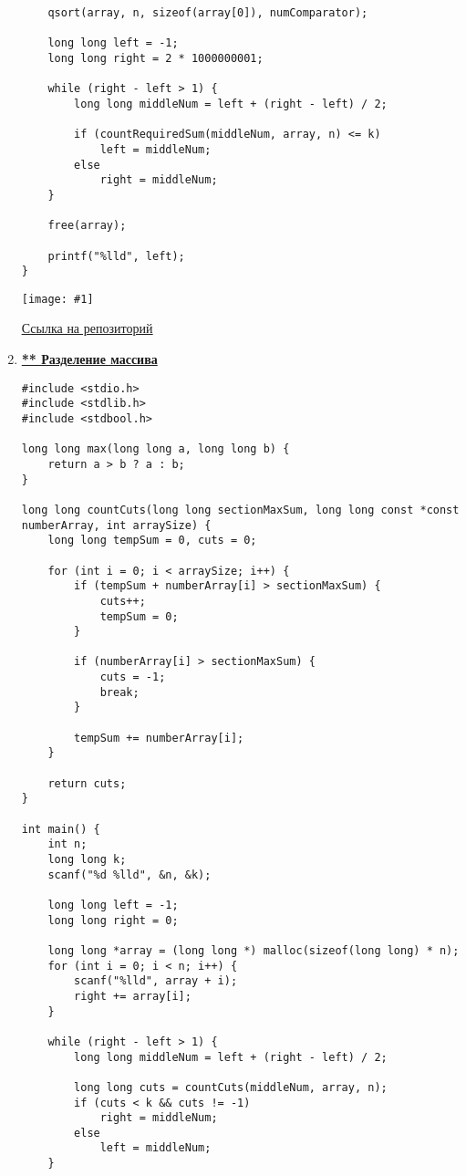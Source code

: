 \documentclass[a4paper,14pt]{extarticle}
\newcommand\codeforcesresult[1]{
    \begin{center}
        \texttt{[image: \#1]}
    \end{center}
}
\begin{document}
\begin{enumerate}
\begin{verbatim}
    qsort(array, n, sizeof(array[0]), numComparator);

    long long left = -1;
    long long right = 2 * 1000000001;

    while (right - left > 1) {
        long long middleNum = left + (right - left) / 2;

        if (countRequiredSum(middleNum, array, n) <= k)
            left = middleNum;
        else
            right = middleNum;
    }

    free(array);

    printf("%lld", left);
}
\end{verbatim}
\codeforcesresult{/codeforceresults/1201С}
\href{https://github.com/IAmProgrammist/programming-and-algorithmization-basics/blob/c/lab10/15.c}{\underline{Ссылка на репозиторий}}

\newpage
\item \href{https://codeforces.com/edu/course/2/lesson/6/3/practice/contest/285083/problem/B}{\textbf{** Разделение массива}}
\begin{verbatim}
#include <stdio.h>
#include <stdlib.h>
#include <stdbool.h>

long long max(long long a, long long b) {
    return a > b ? a : b;
}

long long countCuts(long long sectionMaxSum, long long const *const numberArray, int arraySize) {
    long long tempSum = 0, cuts = 0;

    for (int i = 0; i < arraySize; i++) {
        if (tempSum + numberArray[i] > sectionMaxSum) {
            cuts++;
            tempSum = 0;
        }

        if (numberArray[i] > sectionMaxSum) {
            cuts = -1;
            break;
        }

        tempSum += numberArray[i];
    }

    return cuts;
}

int main() {
    int n;
    long long k;
    scanf("%d %lld", &n, &k);

    long long left = -1;
    long long right = 0;

    long long *array = (long long *) malloc(sizeof(long long) * n);
    for (int i = 0; i < n; i++) {
        scanf("%lld", array + i);
        right += array[i];
    }

    while (right - left > 1) {
        long long middleNum = left + (right - left) / 2;

        long long cuts = countCuts(middleNum, array, n);
        if (cuts < k && cuts != -1)
            right = middleNum;
        else
            left = middleNum;
    }


\end{verbatim}
\end{enumerate}
\end{document}
